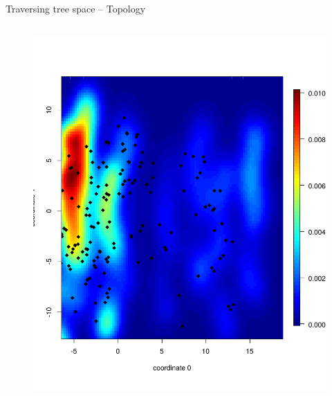 \documentclass[newPxFont,numfooter,sectionpages]{beamer}
\begin{document}
\begin{frame}{Traversing tree space -- Topology}
\begin{column}{0.5\textwidth}
\begin{center}
\begin{figure}
	\includegraphics[width=\textwidth]{figures/mds_RF_STL_denv4.pdf}
\end{figure}
 \end{center}

\end{column}
\end{frame}
\end{document}
